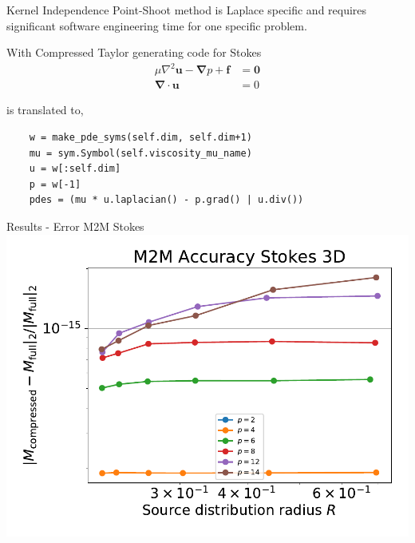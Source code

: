 \documentclass[10pt]{beamer}
\begin{document}
\begin{frame}[fragile]{Kernel Independence}
 Point-Shoot method is Laplace specific and requires significant software engineering time for one specific problem.
 
 With Compressed Taylor generating code for Stokes
 \begin{align*} \mu \nabla^2 \mathbf{u} -\boldsymbol{\nabla}p + \mathbf{f} &= \boldsymbol{0} \\
 \boldsymbol{\nabla}\cdot\mathbf{u}&= 0 \end{align*}

 is translated to,
 
 \begin{verbatim}
    w = make_pde_syms(self.dim, self.dim+1)
    mu = sym.Symbol(self.viscosity_mu_name)
    u = w[:self.dim]
    p = w[-1]
    pdes = (mu * u.laplacian() - p.grad() | u.div())
 \end{verbatim}

\end{frame}

\begin{frame}[fragile]{Results - Error M2M Stokes}
\includegraphics[scale=0.6]{figures/accuracy-stokes-3d.pdf}
\end{frame}
\end{document}
